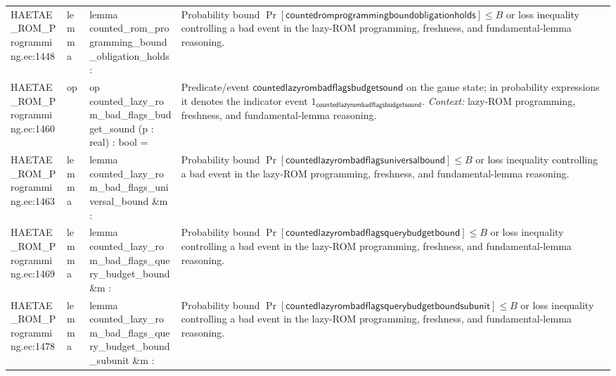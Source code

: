 \documentclass[10pt]{article}
\begin{document}
\begin{longtable}{L{0.11\textwidth}L{0.055\textwidth}L{0.385\textwidth}L{0.41\textwidth}}
HAETAE\_\allowbreak{}ROM\_\allowbreak{}Programming.\allowbreak{}ec:\allowbreak{}1448 & lemma & {\ttfamily\scriptsize lemma counted\_\allowbreak{}rom\_\allowbreak{}programming\_\allowbreak{}bound\_\allowbreak{}obligation\_\allowbreak{}holds :} & Probability bound $\Pr[\mathsf{countedromprogrammingboundobligationholds}]\le B$ or loss inequality controlling a bad event in the lazy-ROM programming, freshness, and fundamental-lemma reasoning. \\
HAETAE\_\allowbreak{}ROM\_\allowbreak{}Programming.\allowbreak{}ec:\allowbreak{}1460 & op & {\ttfamily\scriptsize op counted\_\allowbreak{}lazy\_\allowbreak{}rom\_\allowbreak{}bad\_\allowbreak{}flags\_\allowbreak{}budget\_\allowbreak{}sound (p : real) : bool =} & Predicate/event $\mathsf{countedlazyrombadflagsbudgetsound}$ on the game state; in probability expressions it denotes the indicator event $1_{\mathsf{countedlazyrombadflagsbudgetsound}}$. \emph{Context:} lazy-ROM programming, freshness, and fundamental-lemma reasoning. \\
HAETAE\_\allowbreak{}ROM\_\allowbreak{}Programming.\allowbreak{}ec:\allowbreak{}1463 & lemma & {\ttfamily\scriptsize lemma counted\_\allowbreak{}lazy\_\allowbreak{}rom\_\allowbreak{}bad\_\allowbreak{}flags\_\allowbreak{}universal\_\allowbreak{}bound \&m :} & Probability bound $\Pr[\mathsf{countedlazyrombadflagsuniversalbound}]\le B$ or loss inequality controlling a bad event in the lazy-ROM programming, freshness, and fundamental-lemma reasoning. \\
HAETAE\_\allowbreak{}ROM\_\allowbreak{}Programming.\allowbreak{}ec:\allowbreak{}1469 & lemma & {\ttfamily\scriptsize lemma counted\_\allowbreak{}lazy\_\allowbreak{}rom\_\allowbreak{}bad\_\allowbreak{}flags\_\allowbreak{}query\_\allowbreak{}budget\_\allowbreak{}bound \&m :} & Probability bound $\Pr[\mathsf{countedlazyrombadflagsquerybudgetbound}]\le B$ or loss inequality controlling a bad event in the lazy-ROM programming, freshness, and fundamental-lemma reasoning. \\
HAETAE\_\allowbreak{}ROM\_\allowbreak{}Programming.\allowbreak{}ec:\allowbreak{}1478 & lemma & {\ttfamily\scriptsize lemma counted\_\allowbreak{}lazy\_\allowbreak{}rom\_\allowbreak{}bad\_\allowbreak{}flags\_\allowbreak{}query\_\allowbreak{}budget\_\allowbreak{}bound\_\allowbreak{}subunit \&m :} & Probability bound $\Pr[\mathsf{countedlazyrombadflagsquerybudgetboundsubunit}]\le B$ or loss inequality controlling a bad event in the lazy-ROM programming, freshness, and fundamental-lemma reasoning. \\

\end{longtable}
\end{document}
